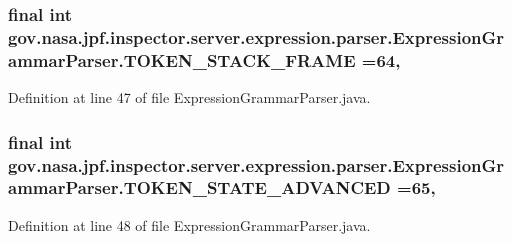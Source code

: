 \subsubsection[{\texorpdfstring{T\+O\+K\+E\+N\+\_\+\+S\+T\+A\+C\+K\+\_\+\+F\+R\+A\+ME}{TOKEN_STACK_FRAME}}]{\setlength{\rightskip}{0pt plus 5cm}final int gov.\+nasa.\+jpf.\+inspector.\+server.\+expression.\+parser.\+Expression\+Grammar\+Parser.\+T\+O\+K\+E\+N\+\_\+\+S\+T\+A\+C\+K\+\_\+\+F\+R\+A\+ME =64\hspace{0.3cm}{\ttfamily [static]}, {\ttfamily [package]}}\hypertarget{classgov_1_1nasa_1_1jpf_1_1inspector_1_1server_1_1expression_1_1parser_1_1_expression_grammar_parser_a6e4b1bd2fea8f501c82401f37c935722}{}\label{classgov_1_1nasa_1_1jpf_1_1inspector_1_1server_1_1expression_1_1parser_1_1_expression_grammar_parser_a6e4b1bd2fea8f501c82401f37c935722}


Definition at line 47 of file Expression\+Grammar\+Parser.\+java.

\subsubsection[{\texorpdfstring{T\+O\+K\+E\+N\+\_\+\+S\+T\+A\+T\+E\+\_\+\+A\+D\+V\+A\+N\+C\+ED}{TOKEN_STATE_ADVANCED}}]{\setlength{\rightskip}{0pt plus 5cm}final int gov.\+nasa.\+jpf.\+inspector.\+server.\+expression.\+parser.\+Expression\+Grammar\+Parser.\+T\+O\+K\+E\+N\+\_\+\+S\+T\+A\+T\+E\+\_\+\+A\+D\+V\+A\+N\+C\+ED =65\hspace{0.3cm}{\ttfamily [static]}, {\ttfamily [package]}}\hypertarget{classgov_1_1nasa_1_1jpf_1_1inspector_1_1server_1_1expression_1_1parser_1_1_expression_grammar_parser_a108097811c29bbb98aad9334612a9440}{}\label{classgov_1_1nasa_1_1jpf_1_1inspector_1_1server_1_1expression_1_1parser_1_1_expression_grammar_parser_a108097811c29bbb98aad9334612a9440}


Definition at line 48 of file Expression\+Grammar\+Parser.\+java.

